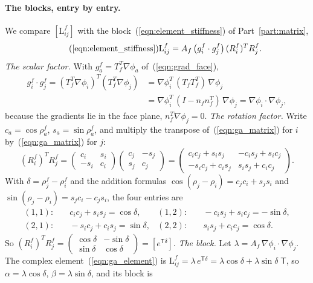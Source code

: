 \paragraph{The blocks, entry by entry.} We compare $[\mathrm L^f_{ij}]$ with the block~(\ref{eqn:element_stiffness}) of Part~\ref{part:matrix},
\begin{equation*}
\tag{\ref{eqn:element_stiffness}}
\mathrm L^f_{ij} = A_f\, \big( g_i^f \cdot g_j^f \big)\, (R_i^f)^T R_j^f .
\end{equation*}
\emph{The scalar factor.} With $g_a^f = T_f^T\nabla\phi_a$ of~(\ref{eqn:grad_face}),
\begin{align*}
g_i^f\cdot g_j^f = (T_f^T\nabla\phi_i)^T(T_f^T\nabla\phi_j) &= \nabla\phi_i^T\,(T_fT_f^T)\,\nabla\phi_j \\
&= \nabla\phi_i^T\,(I - n_fn_f^T)\,\nabla\phi_j = \nabla\phi_i\cdot\nabla\phi_j ,
\end{align*}
because the gradients lie in the face plane, $n_f^T\nabla\phi_j = 0$. \emph{The rotation factor.} Write $c_a = \cos\rho_a^f$, $s_a = \sin\rho_a^f$, and multiply the transpose of~(\ref{eqn:ga_matrix}) for $i$ by~(\ref{eqn:ga_matrix}) for $j$:
\begin{equation*}
(R_i^f)^T R_j^f = \begin{pmatrix} c_i & s_i \\ -s_i & c_i \end{pmatrix}\begin{pmatrix} c_j & -s_j \\ s_j & c_j \end{pmatrix} = \begin{pmatrix} c_ic_j + s_is_j & -c_is_j + s_ic_j \\ -s_ic_j + c_is_j & s_is_j + c_ic_j \end{pmatrix} .
\end{equation*}
With $\delta = \rho_j^f - \rho_i^f$ and the addition formulas $\cos(\rho_j - \rho_i) = c_jc_i + s_js_i$ and $\sin(\rho_j - \rho_i) = s_jc_i - c_js_i$, the four entries are
\begin{align*}
(1,1):&\quad c_ic_j + s_is_j = \cos\delta, & (1,2):&\quad -c_is_j + s_ic_j = -\sin\delta, \\
(2,1):&\quad -s_ic_j + c_is_j = \sin\delta, & (2,2):&\quad s_is_j + c_ic_j = \cos\delta .
\end{align*}
So $(R_i^f)^TR_j^f = \begin{pmatrix}\cos\delta & -\sin\delta\\ \sin\delta & \cos\delta\end{pmatrix} = [e^{\mathsf T\delta}]$. \emph{The block.} Let $\lambda = A_f\,\nabla\phi_i\cdot\nabla\phi_j$. The complex element~(\ref{eqn:ga_element}) is $\mathrm L^f_{ij} = \lambda\, e^{\mathsf T\delta} = \lambda\cos\delta + \lambda\sin\delta\;\mathsf T$, so $\alpha = \lambda\cos\delta$, $\beta = \lambda\sin\delta$, and its block is
